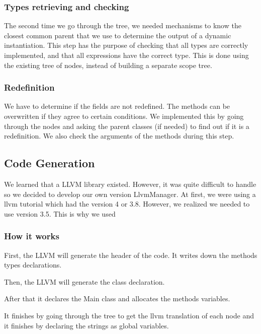 \documentclass[a4paper,11pt]{article}
\begin{document}
  \subsubsection{Types retrieving and checking}
    The second time we go through the tree, we needed mechanisms to know the closest common parent that we use to determine the output 
    of a dynamic instantiation. 
    This step has the purpose of checking that all types are correctly implemented, and that all expressions have the correct type. This is done using the existing tree of nodes, instead of building a separate scope tree.

  \subsubsection{Redefinition}
    We have to determine if the  fields are not redefined. 
    The methods can be overwritten if they agree to certain conditions. We implemented this by going through the nodes
    and asking the parent classes (if needed) to find out if it is a redefinition.
    We also check the arguments of the methods during this step.



\subsection{Code Generation}
  \label{sec:codeGeneration}

  We learned that a LLVM library existed. However, it was quite difficult to handle so we decided to develop 
  our own version LlvmManager. At first, we were using a llvm tutorial which had the version 4 or 3.8. 
  However, we realized we needed to use version 3.5. This is why we used 

    \subsubsection{How it works}
    First, the LLVM will generate the header of the code. It writes down the methods types declarations. 

    Then, the LLVM will generate the class declaration.

    After that it declares the Main class and allocates the methods variables.

    It finishes by going through the tree to get the llvm translation of each node and it finishes by declaring the strings as global variables.
\end{document}
